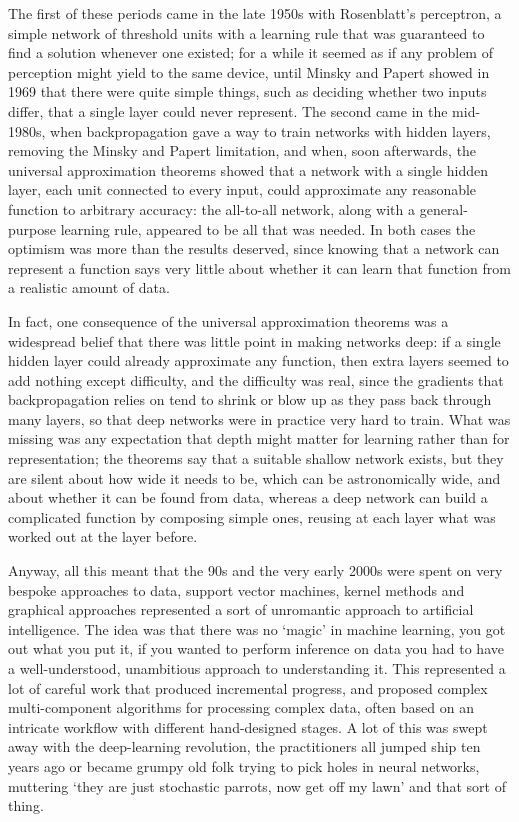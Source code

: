 \documentclass[12pt]{article}
\begin{document}
The first of these periods came in the late 1950s with Rosenblatt's
perceptron, a simple network of threshold units with a learning rule
that was guaranteed to find a solution whenever one existed; for a
while it seemed as if any problem of perception might yield to the
same device, until Minsky and Papert showed in 1969 that there were
quite simple things, such as deciding whether two inputs differ, that
a single layer could never represent. The second came in the
mid-1980s, when backpropagation gave a way to train networks with
hidden layers, removing the Minsky and Papert limitation, and when,
soon afterwards, the universal approximation theorems showed that a
network with a single hidden layer, each unit connected to every
input, could approximate any reasonable function to arbitrary
accuracy: the all-to-all network, along with a general-purpose
learning rule, appeared to be all that was needed. In both cases the
optimism was more than the results deserved, since knowing that a network can
represent a function says very little about whether it can learn that
function from a realistic amount of data.

In fact, one consequence of the universal approximation theorems was a
widespread belief that there was little point in making networks deep:
if a single hidden layer could already approximate any function, then
extra layers seemed to add nothing except difficulty, and the
difficulty was real, since the gradients that backpropagation relies
on tend to shrink or blow up as they pass back through many layers, so
that deep networks were in practice very hard to train. What was
missing was any expectation that depth might matter for learning
rather than for representation; the theorems say that a suitable
shallow network exists, but they are silent about how wide it needs to
be, which can be astronomically wide, and about whether it can be
found from data, whereas a deep network can build a complicated
function by composing simple ones, reusing at each layer what was
worked out at the layer before.

Anyway, all this meant that the 90s and the very early 2000s were
spent on very bespoke approaches to data, support vector machines,
kernel methods and graphical approaches represented a sort of
unromantic approach to artificial intelligence. The idea was that
there was no `magic' in machine learning, you got out what you put it,
if you wanted to perform inference on data you had to have a
well-understood, unambitious approach to understanding it. This
represented a lot of careful work that produced incremental progress,
and proposed complex multi-component algorithms for processing complex
data, often based on an intricate workflow with different
hand-designed stages.  A lot of this was swept away with the
deep-learning revolution, the practitioners all jumped ship ten years
ago or became grumpy old folk trying to pick holes in neural networks,
muttering `they are just stochastic parrots, now get off my lawn' and
that sort of thing.
\end{document}
